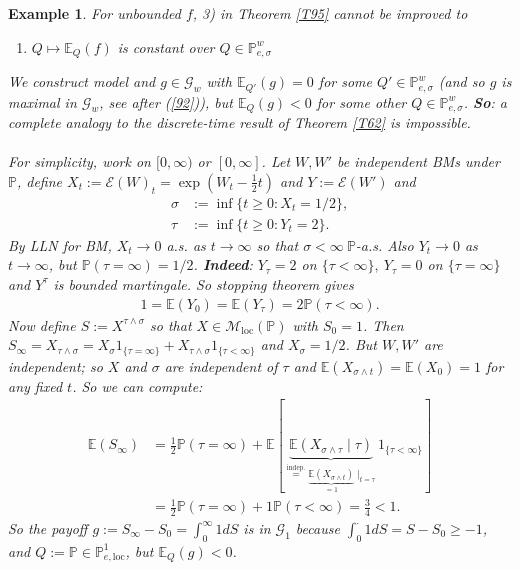 \documentclass[12pt,a4paper, twoside]{article}
\newtheorem{exmp}{Example}[section]
\theoremstyle{definition}
\newcommand{\EE}{\mathbb{E}} %
\newcommand{\PP}{\mathbb{P}} %
\begin{document}
\begin{exmp} For unbounded $f$, 3) in Theorem \ref{T95} cannot be improved to 
\begin{enumerate}
\item[3'.] $Q \mapsto \EE_Q(f)$ is constant over $Q \in \PP_{e, \sigma}^w$
\end{enumerate}
We construct model and $g \in \mathcal{G}_w$ with $\EE_{Q'}(g)=0$ for some $Q' \in \PP_{e, \sigma}^w$ (and so $g$ is maximal in $\mathcal{G}_w$, see after (\ref{92})), but $\EE_Q(g) <0$ for some other $Q \in \PP_{e, \sigma}^w $. \textbf{So}: a complete analogy to the discrete-time result of Theorem \ref{T62} is impossible. \\
\\
For simplicity,  work on $[0, \infty)$ or $[0, \infty]$. Let $W,W'$ be independent BMs under $\PP$, define $X_t:= \mathcal{E}(W)_t = \exp(W_t- \frac{1}{2}t)$ and $Y:= \mathcal{E}(W')$ and 
\begin{align*}
\sigma&:= \inf \{ t \geq 0 : X_t = 1/2\}, \\
\tau &:= \inf\{ t \geq 0 : Y_t = 2 \}.  
\end{align*}
By LLN for BM, $X_t \to 0$ a.s. as $t \to \infty$ so that $\sigma < \infty \ \PP$-a.s. Also $Y_t \to 0$ as $t \to \infty$, but $\PP( \tau = \infty) = 1/2$. \textbf{Indeed}: $Y_\tau = 2$ on $\{ \tau < \infty\}, \ Y_\tau =0$ on $\{ \tau = \infty\}$ and $Y^\tau$ is bounded martingale. So stopping theorem gives
\begin{align*}
1 = \EE(Y_0)= \EE( Y_\tau) = 2 \PP( \tau < \infty). 
\end{align*} 
Now define $S:= X^{ \tau \wedge \sigma}$ so that $X \in \mathcal{M}_\text{loc}(\PP)$ with $S_0=1$. Then $S_\infty = X_{ \tau \wedge \sigma} = X_\sigma 1_{\{ \tau = \infty\}} + X_{ \tau \wedge \sigma} 1_{\{ \tau < \infty\}}$ and $X_\sigma = 1/2$. But $W,W'$ are independent; so $X$ and $\sigma$ are independent of $\tau$ and $\EE( X_{ \sigma \wedge t})= \EE(X_0)=1$ for any fixed $t$. So we can compute: 
\begin{align*}
\EE(S_\infty) &= \frac{1}{2} \PP( \tau = \infty) + \EE[ \underbrace{\EE( X_{ \sigma \wedge \tau} \mid \tau)}_{ \overset{\text{indep.}}= \underbrace{\EE(X_{ \sigma \wedge t})}_{=1} \mid_{t = \tau}} 1_{\{ \tau < \infty\}} ] \\
&= \frac{1}{2} \PP( \tau = \infty) + 1 \PP( \tau < \infty) = \frac{3}{4}< 1. 
\end{align*}
So the payoff $g:= S_\infty - S_0 = \int_0^\infty 1 dS$ is in $\mathcal{G}_1$ because $\int_0^\cdot 1dS = S-S_0 \geq -1$, and $Q:= \PP \in \PP_{e, \text{loc}}^1$, but $\EE_Q(g) < 0$. 

\end{exmp}
\end{document}
